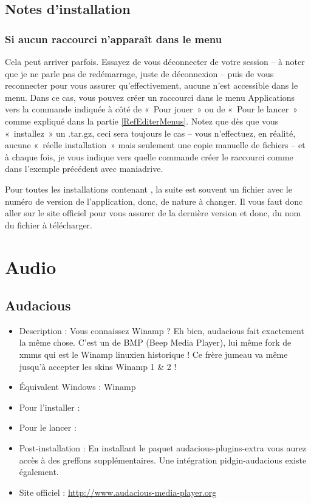 \subsection{Notes d'installation}
\subsubsection{Si aucun raccourci n'apparaît dans le menu}
Cela peut arriver parfois. Essayez de vous déconnecter de votre session -- à noter que je ne parle pas de redémarrage, juste de déconnexion -- puis de vous reconnecter pour vous assurer qu'effectivement, aucune  n'est accessible dans le menu. Dans ce cas, vous pouvez créer un raccourci dans le menu Applications vers la commande indiquée à côté de «~Pour jouer~» ou de «~Pour le lancer~» comme expliqué dans la partie \ref{RefEditerMenus}. Notez que dès que vous «~installez~» un .tar.gz, ceci sera toujours le cas -- vous n'effectuez, en réalité, aucune «~réelle installation~» mais seulement une copie manuelle de fichiers -- et à chaque fois, je vous indique vers quelle commande créer le raccourci comme dans l'exemple précédent avec maniadrive.
\begin{attention}
Pour toutes les installations contenant , la suite est souvent un fichier avec le numéro de version de l'application, donc, de nature à changer. Il vous faut donc aller sur le site officiel pour vous assurer de la dernière version et donc, du nom du fichier à télécharger.
\end{attention}
\section{Audio}
\subsection{Audacious}
\label{RefInstallAudacious}
\begin{itemize}
\begingroup
{}
\item Description : Vous connaissez Winamp ? Eh bien, audacious fait exactement la même chose. C'est un  de BMP (Beep Media Player), lui même fork de xmms qui est le Winamp linuxien historique ! Ce frère jumeau va même jusqu'à accepter les skins Winamp 1 \& 2 !{\par}
\item Équivalent Windows : Winamp{\par}
\item Pour l'installer : 
\item Pour le lancer : 
\item Post-installation :  En installant le paquet audacious-plugins-extra vous aurez accès à des greffons supplémentaires. Une intégration pidgin-audacious existe également.{\par}
\endgroup
\item Site officiel : \url{http://www.audacious-media-player.org}{\par}
\end{itemize}
\newpage
